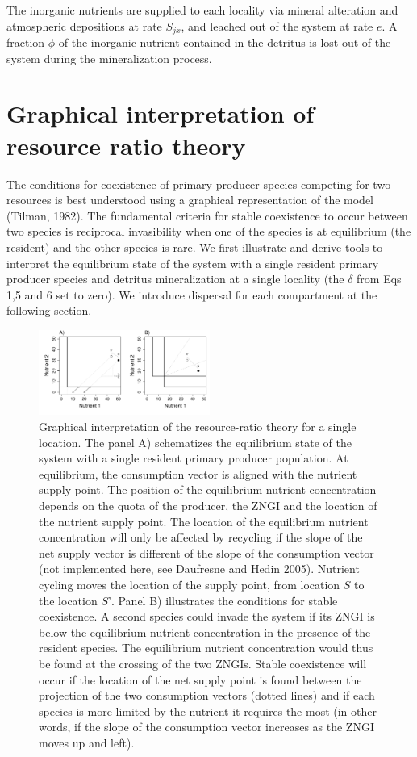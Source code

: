 \documentclass[letterpaper,twocolumn,showkeys]{revtex4-1}
\begin{document}
The inorganic nutrients are supplied to each locality via mineral alteration and atmospheric depositions at rate $S_{jx}$, and leached out of the system at rate $e$. A fraction $\phi$ of the inorganic nutrient contained in the detritus is lost out of the system during the mineralization process.

\section{Graphical interpretation of resource ratio theory}

The conditions for coexistence of primary producer species competing for two resources is best understood using a graphical representation of the model (Tilman, 1982). The fundamental criteria for stable coexistence to occur between two species is reciprocal invasibility when one of the species is at equilibrium (the resident) and the other species is rare. We first illustrate and derive tools to interpret the equilibrium state of the system with a single resident primary producer species and detritus mineralization at a single locality (the $\delta$ from Eqs 1,5 and 6 set to zero). We introduce dispersal for each compartment at the following section. 

\begin{figure}[tb!]
   \centering
   \includegraphics[width=0.5\textwidth]{R-Ratio_theory.pdf}
   \caption{Graphical interpretation of the resource-ratio theory for a single location. The panel A) schematizes the equilibrium state of the system with a single resident primary producer population.  At equilibrium, the consumption vector is aligned with the nutrient supply point. The position of the equilibrium nutrient concentration depends on the quota of the producer, the ZNGI and the location of the nutrient supply point. The location of the equilibrium nutrient concentration will only be affected by recycling if the slope of the net supply vector is different of the slope of the consumption vector (not implemented here, see Daufresne and Hedin 2005). Nutrient cycling moves the location of the supply point, from location $S$ to the location $S’$. Panel B) illustrates the conditions for stable coexistence. A second species could invade the system if its ZNGI is below the equilibrium nutrient concentration in the presence of the resident species. The equilibrium nutrient concentration would thus be found at the crossing of the two ZNGIs. Stable coexistence will occur if the location of the net supply point is found between the projection of the two consumption vectors (dotted lines) and if each species is more limited by the nutrient it requires the most (in other words, if the slope of the consumption vector increases as the ZNGI moves up and left).}
   \label{f:R-Ratio_theory}
\end{figure}
\end{document}
